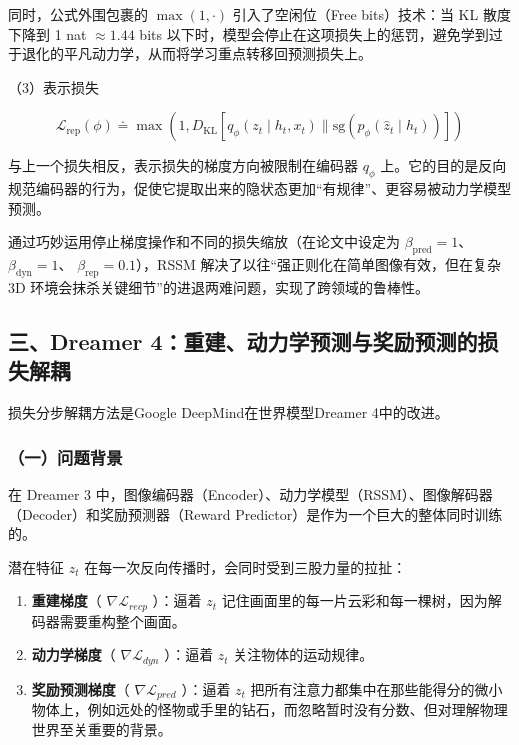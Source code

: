 同时，公式外围包裹的 \(\max(1, \cdot)\) 引入了空闲位（Free bits）技术：当 KL 散度下降到 1 nat \(\approx 1.44\) bits 以下时，模型会停止在这项损失上的惩罚，避免学到过于退化的平凡动力学，从而将学习重点转移回预测损失上。

（3）表示损失

\[
\mathcal{L}_{\mathrm{rep}}(\phi)
\doteq
\max\left(
1,
D_{\mathrm{KL}}\left[
q_{\phi}(z_t \mid h_t, x_t)
\parallel
\mathrm{sg}(p_{\phi}(\hat{z}_t \mid h_t))
\right]
\right)
\]

与上一个损失相反，表示损失的梯度方向被限制在编码器 \(q_{\phi}\) 上。它的目的是反向规范编码器的行为，促使它提取出来的隐状态更加``有规律''、更容易被动力学模型预测。

通过巧妙运用停止梯度操作和不同的损失缩放（在论文中设定为 \(\beta_{\mathrm{pred}} = 1\)、 \(\beta_{\mathrm{dyn}} = 1\)、 \(\beta_{\mathrm{rep}} = 0.1\)），RSSM 解决了以往``强正则化在简单图像有效，但在复杂 3D 环境会抹杀关键细节''的进退两难问题，实现了跨领域的鲁棒性。

\hypertarget{ux4e09dreamer-4ux91cdux5efaux52a8ux529bux5b66ux9884ux6d4bux4e0eux5956ux52b1ux9884ux6d4bux7684ux635fux5931ux89e3ux8026}{%
\subsection{三、Dreamer 4：重建、动力学预测与奖励预测的损失解耦}\label{ux4e09dreamer-4ux91cdux5efaux52a8ux529bux5b66ux9884ux6d4bux4e0eux5956ux52b1ux9884ux6d4bux7684ux635fux5931ux89e3ux8026}}

损失分步解耦方法是Google DeepMind在世界模型Dreamer 4中的改进。

\hypertarget{ux4e00ux95eeux9898ux80ccux666f-7}{%
\subsubsection{（一）问题背景}\label{ux4e00ux95eeux9898ux80ccux666f-7}}

在 Dreamer 3 中，图像编码器（Encoder）、动力学模型（RSSM）、图像解码器（Decoder）和奖励预测器（Reward Predictor）是作为一个巨大的整体同时训练的。

潜在特征 \(z_t\) 在每一次反向传播时，会同时受到三股力量的拉扯：

\begin{enumerate}
\def\labelenumi{\arabic{enumi}.}
\tightlist
\item
  \textbf{重建梯度}（ \(\nabla \mathcal{L}_{recp}\) ）：逼着 \(z_t\) 记住画面里的每一片云彩和每一棵树，因为解码器需要重构整个画面。
\item
  \textbf{动力学梯度}（ \(\nabla \mathcal{L}_{dyn}\) ）：逼着 \(z_t\) 关注物体的运动规律。
\item
  \textbf{奖励预测梯度}（ \(\nabla \mathcal{L}_{pred}\) ）：逼着 \(z_t\) 把所有注意力都集中在那些能得分的微小物体上，例如远处的怪物或手里的钻石，而忽略暂时没有分数、但对理解物理世界至关重要的背景。
\end{enumerate}


